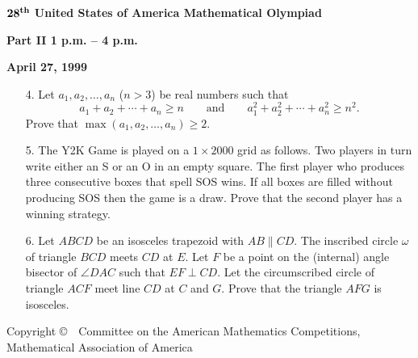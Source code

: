 \documentclass[12pt]{article}
\begin{document}
\newpage

\begin{center}
${\bf 28^{th}}$ {\bf United States of America Mathematical Olympiad}
\end{center}



\begin{center}
{\bf  Part  II \hspace{ 6mm} 1 p.m. -- 4 p.m.}
\end{center}


\begin{center}
{\bf April 27, 1999}
\end{center}

\bigskip

\begin{itemize}

\item[4.]
Let $a_{1}, a_{2}, \dots, a_{n}$ ($n > 3$) be real numbers such that
\[
a_{1} + a_{2} + \cdots + a_{n} \geq n \qquad \mbox{and} \qquad
a_{1}^{2} + a_{2}^{2} +
\cdots + a_{n}^{2} \geq n^{2}.
\]
Prove that $\max(a_{1}, a_{2}, \dots,
a_{n}) \geq 2$.

\item[5.]
The Y2K Game is played on a
$1 \times 2000$ grid as follows.
Two players in turn write either an S or
an O in an empty square. The first player who produces three
consecutive boxes that spell SOS wins. If all boxes are filled without
producing SOS then the game is a draw. Prove that the second player
has a winning strategy.

\item[6.]
Let $ABCD$ be an isosceles trapezoid with $AB \parallel CD$. The inscribed
circle $\omega$ of triangle $BCD$ meets $CD$ at $E$. Let $F$ be a point on
the (internal) angle bisector of $\angle DAC$ such that $EF \perp CD$. Let the
circumscribed circle of triangle $ACF$ meet line $CD$ at $C$ and $G$. Prove
that the triangle $AFG$ is isosceles.

\end{itemize}

\vfill
{\small
\begin{center}
Copyright \copyright \ \  Committee on the American  Mathematics
Competitions,\\
Mathematical Association of America
\end{center}
}
\end{document}
